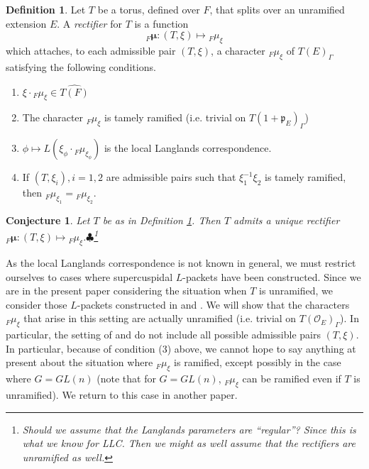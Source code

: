 \documentclass[11pt]{amsart}
\theoremstyle{plain}
\newtheorem{conjecture}[theorem]{Conjecture}
\newcommand{\MAxxx}[1]{$\clubsuit$\footnote{#1}}
\theoremstyle{definition}
\newtheorem{definition}[theorem]{Definition}
\begin{document}
\begin{definition}\label{rectifierdefinition}
  Let $T$ be a torus, defined over $F$, that splits over an unramified
  extension $E$.  A \emph{rectifier} for $T$ is a function $${}_F
  \boldsymbol\mu : (T, \xi) \mapsto {}_F \mu_{\xi}$$ which attaches,
  to each admissible pair $(T, \xi)$, a character ${}_F
  \mu_{\xi}$ of $T(E)_{\Gamma}$ satisfying the following conditions.

\begin{enumerate}
\item $\xi \cdot {}_F \mu_{\xi} \in \widehat{T(F)}$

\item The character ${}_F \mu_{\xi}$ is tamely ramified (i.e. trivial on
  $T(1 + \mathfrak{p}_E)_{\Gamma}$)

\item $\phi \mapsto L(\xi_{\phi} \cdot {}_F \mu_{\xi_{\phi}})$
  is the local Langlands correspondence.

\item If $(T, \xi_i), i = 1,2$ are admissible pairs  such that
$\xi_1^{-1} \xi_2$ is tamely ramified, then
${}_F \mu_{\xi_1} = {}_F \mu_{\xi_2}$.
\end{enumerate}

\end{definition}

\begin{conjecture}
  Let $T$ be as in Definition \ref{rectifierdefinition}.  Then $T$
  admits a unique rectifier ${}_F \boldsymbol\mu : (T, \xi) \mapsto
  {}_F \mu_{\xi}$.\MAxxx{Should we assume that the Langlands parameters
  are ``regular''?  Since this is what we know for LLC.  Then we might
  as well assume that the rectifiers are unramified as well.}
\end{conjecture}

As the local Langlands correspondence is not known in general, we must restrict
ourselves to cases where supercuspidal $L$-packets have been constructed.
Since we are in the present paper considering the situation when $T$ is unramified,
we consider those $L$-packets constructed in \cite{debackerreeder} and \cite{reeder}.
We will show that the characters ${}_F \mu_{\xi}$ that arise in this setting
are actually unramified (i.e. trivial on $T(\mathcal{O}_E)_{\Gamma}$).  In particular,
the setting
of \cite{debackerreeder} and \cite{reeder} do not include all possible admissible
pairs $(T, \xi)$.  In particular, because of condition (3) above, we cannot hope
to say anything at present about the situation where ${}_F \mu_{\xi}$ is ramified,
except possibly in the case where $G = GL(n)$ (note that for
$G = GL(n)$, ${}_F \mu_{\xi}$ can be ramified even if $T$ is unramified).
We return to this case in another paper.
\end{document}
